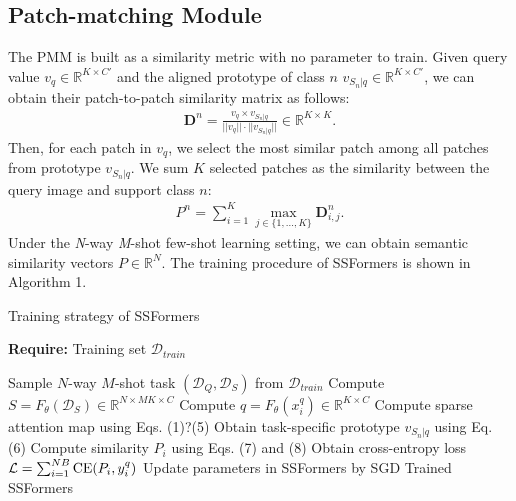 \documentclass{SCIS2019}
\begin{document}
\subsection{Patch-matching Module}
The PMM is built as a similarity metric with no parameter to train. Given query value $v_q\in \mathbb{R}^{K\times C'}$ and the aligned prototype of class $n$ $v_{S_n|q} \in \mathbb{R}^{K\times C'}$, we can obtain their patch-to-patch similarity matrix as follows:
\begin{gather}
	\mathbf{D}^n = \frac{v_q\times v_{S_n|q}}{||v_q||\cdot||v_{S_n|q}||} \in \mathbb{R}^{K\times K}.
\end{gather} 
Then, for each patch in $v_q$, we select the most similar patch among all patches from prototype $v_{S_n|q}$. We sum $K$ selected patches as the similarity between the query image and support class $n$:
\begin{gather}
	P^n = \sum_{i=1}^{K}  \max\limits_{j\in \{1,...,K\}} \mathbf{D}^n_{i,j}.
\end{gather}
Under the \emph{N}-way \emph{M}-shot few-shot learning setting, we can obtain semantic similarity vectors $P\in \mathbb{R}^N$. The training procedure of SSFormers is shown in Algorithm 1.

\begin{algorithm}[t]
	\caption{Training strategy of SSFormers}
	\textbf{Require:} Training set $\mathcal{D}_{train}$
	\begin{algorithmic}[1] 
		\STATE Sample $N$-way $M$-shot task $(\mathcal{D}_{Q},\mathcal{D}_S)$ from $\mathcal{D}_{train}$
		\STATE Compute $S= F_{\theta}(\mathcal{D}_S) \in \mathbb{R}^{N\times MK \times C}$
		\STATE Compute $q = F_{\theta}(x_i^q)\in\mathbb{R}^{K \times C}$
		\STATE Compute sparse attention map using Eqs. (1)?(5)
		\STATE Obtain task-specific prototype $v_{S_n|q}$ using Eq. (6)
		\STATE Compute similarity $P_i$ using Eqs. (7) and (8)
		\ENDFOR
		\STATE Obtain cross-entropy loss $\mathcal{L}=\sum_{i=1}^{NB}{\rm CE}(P_i, y^q_i)$
		\STATE Update parameters in SSFormers by SGD
		\ENDFOR
		\RETURN Trained SSFormers
	\end{algorithmic}
\end{algorithm}
\end{document}
